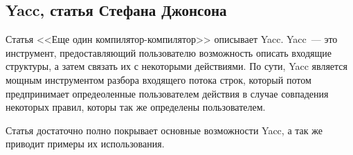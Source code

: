 \subsection{Yacc, статья Стефана Джонсона} \label{subsection_Johnson1975}
Статья <<Еще один компилятор-компилятор>> \cite{Johnson1975} описывает Yacc. Yacc~--- это инструмент, предоставляющий пользователю возможность описать входящие структуры, а затем связать их с некоторыми действиями. По сути, Yacc является мощным инструментом разбора входящего потока строк, который потом предпринимает опредеоленные пользователем действия в случае совпадения некоторых правил, которы так же определены пользователем. 

Статья достаточно полно покрывает основные возможности Yacc, а так же приводит примеры их использования.

